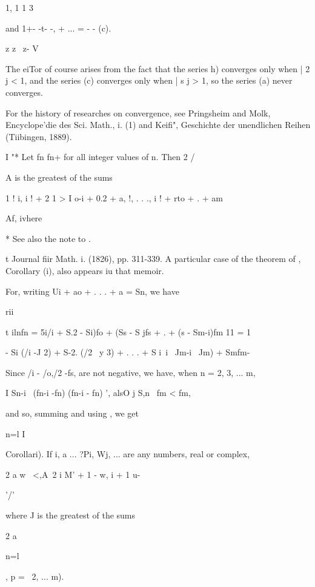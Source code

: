 1, 1 1 3

and 1+- -t- -, + ... = - - (c).

z z~ z- V

The eiTor of course arises from the fact that the series h) converges
only when | 2 j < 1, and the series (c) converges only when | s j > 1,
so the series (a) never converges.

For the history of researches on convergence, see Pringsheim and Molk,
Encyclope'die des Sci. Math., i. (1) and Keifi", Geschichte der
unendlichen Reihen (Tiibingen, 1889).


I "* Let fn fn+ for all integer values of n. Then 2 /

A is the greatest of the sums

1 ! i, i ! + 2 1 > I o-i + 0.2 + a, !, . . ., i ! + rto +   . + am

  Af, ivhere

* See also the note to .

t Journal fiir Math. i. (1826), pp. 311-339. A particular case of the
theorem of , Corollary (i), also appears iu that memoir.

%
%

For, writing Ui + ao + . . . + a = Sn, we have

rii

t ilnfn = 5i/i + S.2 - Si)fo + (Ss - S jfs + . + (s - Sm-i)fm 11 = 1

- Si (/i -J 2) + S-2. (/2 ~y 3) + . . . + S i\ i \ Jm-i ~Jm) + Smfm-

Since /i - /o,/2 -fs,  are not negative, we have, when n = 2, 3,
... m,

I Sn-i \ (fn-i -fn) (fn-i - fn) ', alsO j S,n \ fm < fm,

and so, summing and using , we get

n=l I

Corollari). If i, a ... ?Pi, Wj, ... are any numbers, real or complex,

2 a w \ <,A\ 2 i M' + 1 - w, i + 1 u-

'/'

where J is the greatest of the sums

2 a

n=l

, p = \, 2, ... m).



